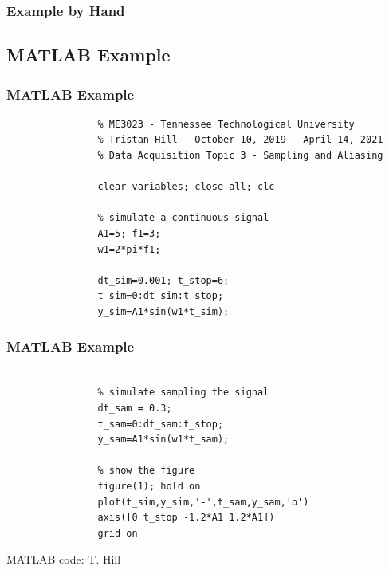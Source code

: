 \documentclass[fleqn]{beamer} %
\newcommand{\sectionIIIsubsectionIIItitle}{Example by Hand}
\newcommand{\sectionIIIsubsectionIVtitle}{MATLAB Example}
\begin{document}
			\begin{frame}
				\frametitle{\sectionIIIsubsectionIIItitle}



			\end{frame}

		\subsection{\sectionIIIsubsectionIVtitle}\label{sectionIIIsubsectionIV}	

			\begin{frame}[containsverbatim]
				\frametitle{\sectionIIIsubsectionIVtitle}\scriptsize

				\begin{lstlisting}
				% ME3023 - Tennessee Technological University 
				% Tristan Hill - October 10, 2019 - April 14, 2021
				% Data Acquisition Topic 3 - Sampling and Aliasing

				clear variables; close all; clc

				% simulate a continuous signal
				A1=5; f1=3;
				w1=2*pi*f1;

				dt_sim=0.001; t_stop=6;
				t_sim=0:dt_sim:t_stop;
				y_sim=A1*sin(w1*t_sim);
				\end{lstlisting}

			\end{frame}

			\begin{frame}[containsverbatim]
				\frametitle{\sectionIIIsubsectionIVtitle}\scriptsize
				
				\begin{lstlisting}

				% simulate sampling the signal
				dt_sam = 0.3;
				t_sam=0:dt_sam:t_stop;
				y_sam=A1*sin(w1*t_sam);

				% show the figure
				figure(1); hold on
				plot(t_sim,y_sim,'-',t_sam,y_sam,'o')
				axis([0 t_stop -1.2*A1 1.2*A1])
				grid on
				\end{lstlisting}


			
				\tiny{MATLAB code: T. Hill}	

			\end{frame}


		
\end{document}
